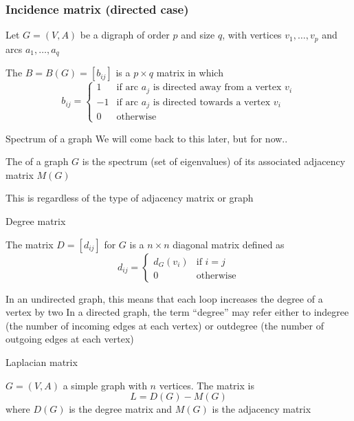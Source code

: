 \documentclass[aspectratio=169]{beamer}\usepackage[]{graphicx}\usepackage[]{xcolor}
\begin{document}
\begin{frame}\frametitle{Incidence matrix (directed case)}
	Let $G=(V,A)$ be a digraph of order $p$ and size $q$, with vertices $v_1, \ldots , v_p$ and arcs $a_1, \ldots , a_q$
	\begin{definition}
	The  $B=B(G)=[b_{ij}]$ is a $p\times q$ matrix in which
	$$b_{ij}=\left \{ 
	\begin{array}{cl}
	1 & \textrm{if arc } a_j  \textrm{ is directed away from a vertex } v_i\\
	-1 & \textrm{if arc } a_j  \textrm{ is directed towards a vertex } v_i\\
	0 & \textrm{otherwise}
	\end{array}
	\right .
	$$
	\end{definition}
\end{frame}
	



\begin{frame}{Spectrum of a graph}
	We will come back to this later, but for now..
	\vfill
	\begin{definition}
		The  of a graph $G$ is the spectrum (set of eigenvalues) of its associated adjacency matrix $M(G)$
	\end{definition}
	\vfill
	This is regardless of the type of adjacency matrix or graph
\end{frame}





\begin{frame}{Degree matrix}
	\begin{definition}
		The  matrix $D=[d_{ij}]$ for $G$ is a $n \times n$ diagonal matrix defined as
		\[
			d_{ij} = \begin{cases}
				d_G(v_i) & \text{if } i = j \\
				0 & \text{otherwise}
			\end{cases}
		\]
	\end{definition}
\vfill
In an undirected graph, this means that each loop increases the degree of a vertex by two
\vfill
In a directed graph, the term ``degree'' may refer either to indegree (the number of incoming edges at each vertex) or outdegree (the number of outgoing edges at each vertex)
\end{frame}

\begin{frame}{Laplacian matrix}
\begin{definition}
	$G=(V,A)$ a simple graph with $n$ vertices. The  matrix is 
	\[
		L=D(G)-M(G)
	\]
	where $D(G)$ is the degree matrix and $M(G)$ is the adjacency matrix
\end{definition}
\end{frame}
\end{document}
